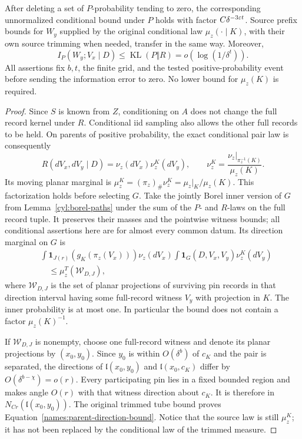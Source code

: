 \begin{lemma}
After deleting a set of \(P\)-probability tending to zero, the
corresponding unnormalized conditional bound under \(P\) holds
with factor \(C\delta^{-3\varepsilon t}\). Source prefix bounds for \(W_y\)
supplied by the original conditional
law \(\mu_z(\cdot\mid K)\), with their own source trimming when
needed, transfer in the same way. Moreover,
\[
 I_P(W_y;V_x\mid D)
       \leq\operatorname{KL}(P\Vert R)
       =o(\log(1/\delta^t)).
\]
All assertions fix \(b,t\), the finite grid, and the tested
positive-probability event before sending the information error to
zero. No lower bound for \(\mu_z(K)\) is required.
\end{lemma}

\begin{proof}
Since \(S\) is known from \(Z\), conditioning on \(A\) does not
change the full record kernel under \(R\). Conditional iid sampling
also allows the other full records to be held. On parents of positive
probability, the exact conditional pair law is consequently
\[
 R(dV_x,dV_y\mid D)=\nu_z(dV_x)\nu_z^K(dV_y),\qquad
 \nu_z^K=\frac{\nu_z|_{\pi_z^{-1}(K)}}{\mu_z(K)}.
\]
Its moving planar marginal is
\(\mu_z^K=(\pi_z)_\#\nu_z^K=\mu_z|_K/\mu_z(K)\).
This factorization holds before selecting \(G\). Take the jointly
Borel inner version of \(G\) from Lemma~\ref{cyl:borel-paths}
under the sum of the \(P\)- and \(R\)-laws on the full record tuple.
It preserves their masses and the pointwise witness bounds; all
conditional assertions here are for almost every common datum.
Its direction
marginal on \(G\) is
\begin{align*}
 &\int\mathbf1_{J(r)}(g_K(\pi_z(V_x)))\nu_z(dV_x)
          \int\mathbf1_G(D,V_x,V_y)\nu_z^K(dV_y)\\
 &\quad\leq\mu_z^T(\mathcal W_{D,J}),
\end{align*}
where \(\mathcal W_{D,J}\) is the set of planar projections of
surviving pin records in that direction interval having some
full-record witness \(V_y\) with projection in \(K\).
The inner probability is at most one. In particular the bound
does not contain a factor \(\mu_z(K)^{-1}\).

If \(\mathcal W_{D,J}\) is nonempty, choose one full-record
witness and denote its planar projections by \((x_0,y_0)\).
Since \(y_0\) is within \(O(\delta^b)\) of
\(c_K\) and the pair is separated, the directions of
\(\mathfrak l(x_0,y_0)\) and \(\mathfrak l(x_0,c_K)\)
differ by \(O(\delta^{b-\chi})=o(r)\).
Every participating pin lies in a fixed bounded region and makes
angle \(O(r)\) with that witness direction about \(c_K\).
It is therefore in \(N_{Cr}(\mathfrak l(x_0,y_0))\).
The original trimmed tube bound proves
Equation~\eqref{names:parent-direction-bound}. Notice that the
source law is still \(\mu_z^K\); it has not been replaced by
the conditional law of the trimmed measure.


\end{proof}
